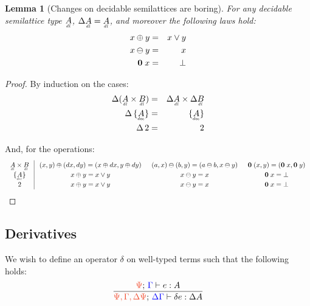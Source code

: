 \documentclass{article}
\theoremstyle{plain}
\newtheorem{lemma}{Lemma}
\theoremstyle{definition}
\newcommand{\longarray}{\renewcommand\arraystretch{1.2}}
\begin{document}
\begin{lemma}[Changes on decidable semilattices are boring]\label{lemma:dl-boring}
  For any decidable semilattice type $\eqlat{A}$, $\Ch \eqlat{A} = \eqlat{A}$,
  and moreover the following laws hold:
  \begin{eqnarray*}
    x \oplus y &=& x \vee y\\
    x \ominus y &=& x\\
    \mathbf{0}\; x &=& \bot
  \end{eqnarray*}
\end{lemma}
\begin{proof}
  By induction on the cases:
  \begin{eqnarray*}
    \Ch(\eqlat{A} \x \eqlat{B}) &=& \Ch \eqlat{A} \x \Ch \eqlat{B}\\
    \Ch\thinspace \Seteq{A} &=& \Seteq{A}\\
    \Ch\thinspace \tbool &=& \tbool
  \end{eqnarray*}

  And, for the operations:
  \[\arraycolsep=0.75em\longarray
  \begin{array}{c|ccc}
    \eqlat{A} \x \eqlat{B}
    & (x,y) \oplus (dx,dy) = (x \oplus dx, y \oplus dy)
    & (a,x) \ominus (b,y) = (a \ominus b, x \ominus y)
    & \zero\; (x,y) = (\zero\; x, \zero\; y)\\
    \Set{\eq{A}}
    & x \oplus y = x \vee y
    & x \ominus y = x
    & \zero\;x = \unit\\
    \tbool
    & x \oplus y = x \vee y
    & x \ominus y = x
    & \zero\;x = \unit\\
  \end{array}
  \]
\end{proof}


\subsection{Derivatives}

We wish to define an operator $\delta$ on well-typed terms such that the following holds:
\[
\infer{\J{\GP,\GG,\Ch\GP}{\Ch\GG}{\delta e}{\Ch A}}
      {\J{\GP}{\GG}{e}{A}}
\]
\end{document}
